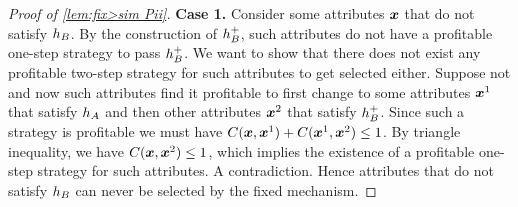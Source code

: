 \begin{proof}[Proof of \cref{lem:fix>sim Pii}]
\textbf{Case 1.} Consider some  attributes $\boldsymbol{x}$  that do not satisfy $h_B$. By the construction of $h_B^+$, such attributes do not have a profitable one-step strategy to pass $h_B^+$. We want to show that there does not exist any profitable two-step strategy for such attributes to get selected either. Suppose not and now such attributes find it profitable to first change to some attributes $\boldsymbol{x}^1$ that satisfy $h_A$ and then other attributes $\boldsymbol{x}^2$ that satisfy $h_B^+$.
Since such a strategy is profitable we must have $C(\boldsymbol{x},\boldsymbol{x}^1)+C(\boldsymbol{x}^1,\boldsymbol{x}^2)\leq1$.
By triangle inequality, we have $C(\boldsymbol{x},\boldsymbol{x}^2)\leq1$, which implies the existence of a profitable one-step strategy for such attributes. A contradiction. Hence attributes that do not satisfy $h_B$ can never be selected by the fixed mechanism.


\end{proof}
